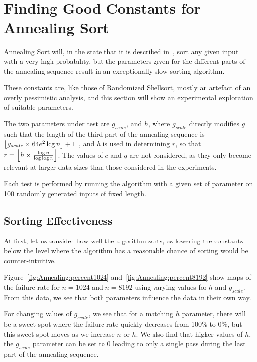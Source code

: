  \FloatBarrier
\section{Finding Good Constants for Annealing Sort}
\label{sec:AnnealingExperiments}

Annealing Sort will, in the state that it is described in~, sort any given input with a very high probability, but the parameters given for the different parts of the annealing sequence result in an exceptionally slow sorting algorithm.

These constants are, like those of Randomized Shellsort, mostly an artefact of an overly pessimistic analysis, and this section will show an experimental exploration of suitable parameters.

The two parameters under test are $g_{scale}$, and $h$, where $g_{scale}$ directly modifies $g$ such that the length of the third part of the annealing sequence is $\floor*{g_{scale} \times 64e^2 \log n} + 1$ , and $h$ is used in determining $r$, so that $r = \floor*{h \times \frac{\log n}{\log \log n}}$.
The values of $c$ and $q$ are not considered, as they only become relevant at larger data sizes than those considered in the experiments.

Each test is performed by running the algorithm with a given set of parameter on 100 randomly generated inputs of fixed length.

\subsection{Sorting Effectiveness}

At first, let us consider how well the algorithm sorts, as lowering the constants below the level where the algorithm has a reasonable chance of sorting would be counter-intuitive.

Figure~\ref{fig:Annealing:percent1024} and~\ref{fig:Annealing:percent8192} show maps of the failure rate for $n = 1024$ and $n = 8192$ using varying values for $h$ and $g_{scale}$.
From this data, we see that both parameters influence the data in their own way.

For changing values of $g_{scale}$, we see that for a matching $h$ parameter, there will be a sweet spot where the failure rate quickly decreases from 100\% to 0\%, but this sweet spot moves as we increase $n$ or $h$. We also find that higher values of $h$, the $g_{scale}$ parameter can be set to $0$ leading to only a single pass during the last part of the annealing sequence.

